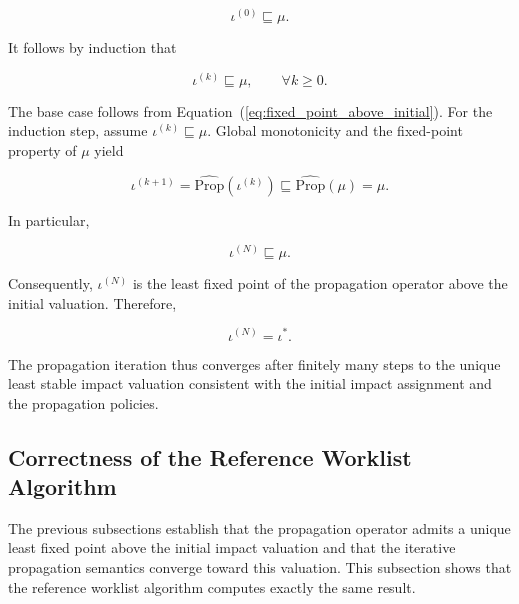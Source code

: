 \documentclass[10pt]{article}
\begin{document}
\begin{equation}
	\iota^{(0)}
	\sqsubseteq
	\mu.
	\label{eq:fixed_point_above_initial}
\end{equation}

It follows by induction that

\begin{equation}
	\iota^{(k)}
	\sqsubseteq
	\mu,
	\qquad
	\forall k\geq 0.
	\label{eq:iteration_below_fixed_point}
\end{equation}

The base case follows from
Equation~(\ref{eq:fixed_point_above_initial}). For the induction step, assume
$\iota^{(k)}\sqsubseteq\mu$. Global monotonicity and the fixed-point property of
$\mu$ yield

\begin{equation}
	\iota^{(k+1)}
	=
	\widehat{\mathrm{Prop}}
	\!\left(
	\iota^{(k)}
	\right)
	\sqsubseteq
	\widehat{\mathrm{Prop}}(\mu)
	=
	\mu.
	\label{eq:minimality_induction_step}
\end{equation}

In particular,

\begin{equation}
	\iota^{(N)}
	\sqsubseteq
	\mu.
	\label{eq:stabilized_minimality}
\end{equation}

Consequently, $\iota^{(N)}$ is the least fixed point of the propagation
operator above the initial valuation. Therefore,

\begin{equation}
	\iota^{(N)}
	=
	\iota^{*}.
	\label{eq:iteration_lfp}
\end{equation}

The propagation iteration thus converges after finitely many steps to the
unique least stable impact valuation consistent with the initial impact
assignment and the propagation policies.

\subsection{Correctness of the Reference Worklist Algorithm}

The previous subsections establish that the propagation operator admits a
unique least fixed point above the initial impact valuation and that the
iterative propagation semantics converge toward this valuation. This subsection
shows that the reference worklist algorithm computes exactly the same result.
\end{document}
